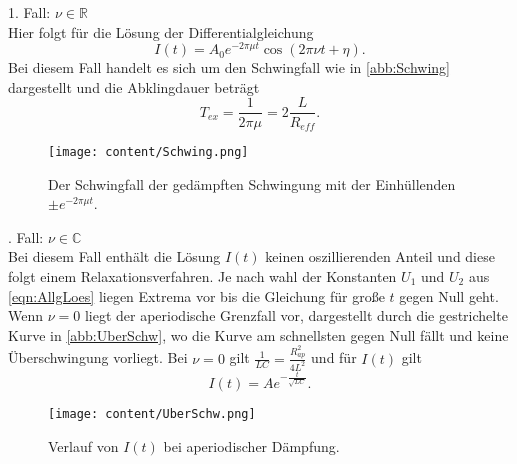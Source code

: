 1. Fall: $\nu\in\mathbb{R}$\\
Hier folgt für die Lösung der Differentialgleichung
\begin{equation}
    I(t) = A_0e^{-2\pi\mu t}\cos(2\pi\nu t + \eta).
\end{equation}
Bei diesem Fall handelt es sich um den Schwingfall wie in \autoref{abb:Schwing} dargestellt und die Abklingdauer beträgt
\begin{equation}
    \label{eqn:TAb}
    T_{ex} = \frac{1}{2\pi\mu} =2\frac{L}{R_{eff}}.
\end{equation}
\begin{figure}[H]
    \centering
    \texttt{[image: content/Schwing.png]}
    \caption{Der Schwingfall der gedämpften Schwingung mit der Einhüllenden $\pm e^{-2\pi\mu t}$. \cite{sample}}
    \label{abb:Schwing}
\end{figure}
. Fall: $\nu\in\mathbb{C}$\\
Bei diesem Fall enthält die Lösung $I(t)$ keinen oszillierenden Anteil und diese folgt einem Relaxationsverfahren.
Je nach wahl der Konstanten $U_1$ und $U_2$ aus \eqref{eqn:AllgLoes} liegen Extrema vor bis die Gleichung für große
$t$ gegen Null geht. Wenn $\nu = 0$ liegt der aperiodische Grenzfall vor, dargestellt durch die gestrichelte Kurve in
\autoref{abb:UberSchw}, wo die Kurve am schnellsten gegen Null fällt und keine Überschwingung vorliegt. Bei $\nu = 0$ gilt
$\frac{1}{LC} = \frac{R^2_{ap}}{4L^2}$ und für $I(t)$ gilt
\begin{equation}
    I(t) = Ae^{-\frac{t}{\sqrt{LC}}}.
\end{equation}
\begin{figure}[H]
    \centering
    \texttt{[image: content/UberSchw.png]}
    \caption{Verlauf von $I(t)$ bei aperiodischer Dämpfung. \cite{sample}}
    \label{abb:UberSchw}
\end{figure}
